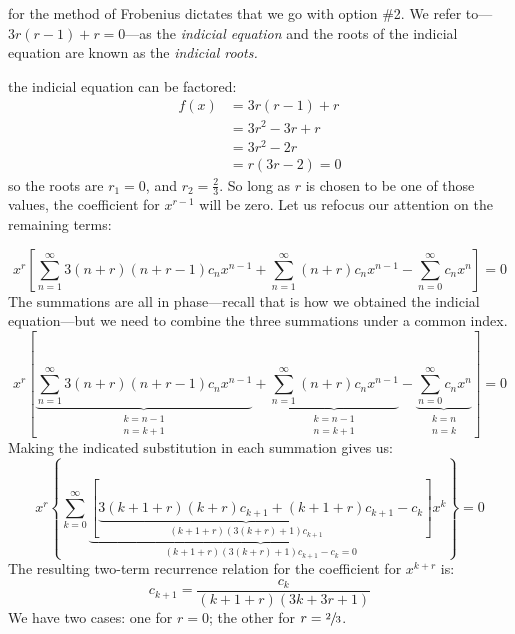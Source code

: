  for the method of Frobenius dictates that we go with option \#2.  We refer to---$3r(r-1)+r = 0$---as the \emph{indicial equation} and the roots of the indicial equation are known as the \emph{indicial roots.} 

 the indicial equation can be factored:
\begin{align*}
f(x) &= 3r(r-1)+r \\
&=3r^2-3r+r \\
&=3r^2-2r \\
&=r(3r-2) = 0
\end{align*}
so the roots are $r_1=0$, and $r_2 = \frac{2}{3}$. So long as $r$ is chosen to be one of those values, the coefficient for $x^{r-1}$ will be zero.  Let us refocus our attention on the remaining terms:

\begin{equation*}
x^r \left[\sum\limits_{n=1}^{\infty} 3(n+r)(n+r-1)c_nx^{n-1} + \sum\limits_{n=1}^{\infty} (n+r)c_nx^{n-1} - \sum\limits_{n=0}^{\infty}c_nx^n \right] = 0
\end{equation*}
The summations are all in phase---recall that is how we obtained the indicial equation---but we need to combine the three summations under a common index.
\begin{equation*}
x^r \left[\underbrace{\sum\limits_{n=1}^{\infty} 3(n+r)(n+r-1)c_nx^{n-1}}_{\substack{k=n-1 \\ n=k+1}} + \underbrace{\sum\limits_{n=1}^{\infty} (n+r)c_nx^{n-1}}_{\substack{k=n-1 \\ n=k+1}} - \underbrace{\sum\limits_{n=0}^{\infty}c_nx^n}_{\substack{k=n \\n=k}} \right] = 0
\end{equation*}
Making the indicated substitution in each summation gives us:
\begin{equation*}
x^r\left\{\sum\limits_{k=0}^{\infty} \underbrace{\left[\underbrace{3(k+1+r)(k+r)c_{k+1}+(k+1+r)c_{k+1}}_{(k+1+r)(3(k+r)+1)c_{k+1}} - c_k\right]}_{(k+1+r)(3(k+r)+1)c_{k+1} - c_k = 0}x^k\right\} = 0
\end{equation*}
The resulting two-term recurrence relation for the coefficient for $x^{k+r}$ is:
\begin{equation*}
c_{k+1}=\frac{c_k}{(k+1+r)(3k+3r+1)}
\end{equation*}
We have two cases: one for $r=0$; the other for $r = \sfrac{2}{3}$.

